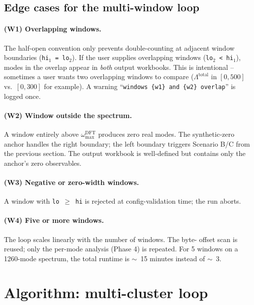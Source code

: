 \documentclass[10pt,a4paper,twoside]{article}
\begin{document}
\subsection{Edge cases for the multi-window loop}

\paragraph{(W1) Overlapping windows.}
The half-open convention only prevents double-counting at adjacent
window boundaries (\texttt{hi$_1$ = lo$_2$}). If the user supplies
overlapping windows (\texttt{lo$_2$ < hi$_1$}), modes in the overlap
appear in \emph{both} output workbooks. This is intentional --
sometimes a user wants two overlapping windows to compare
($\Lambda^\text{total}$ in $[0, 500]$ vs.\ $[0, 300]$ for example).
A warning ``\texttt{windows \{w1\} and \{w2\} overlap}'' is logged
once.

\paragraph{(W2) Window outside the spectrum.}
A window entirely above $\omega_\text{max}^\text{DFT}$ produces zero
real modes. The synthetic-zero anchor handles the right boundary;
the left boundary triggers Scenario B/C from the previous section.
The output workbook is well-defined but contains only the
anchor's zero observables.

\paragraph{(W3) Negative or zero-width windows.}
A window with \texttt{lo $\geq$ hi} is rejected at config-validation
time; the run aborts.

\paragraph{(W4) Five or more windows.}
The loop scales linearly with the number of windows. The byte-
offset scan is reused; only the per-mode analysis (Phase 4) is
repeated. For 5 windows on a 1260-mode spectrum, the total
runtime is ${\sim}$~15 minutes instead of ${\sim}$~3.

\section{Algorithm: multi-cluster loop}
\label{sec:algo-multi-cluster}
\end{document}
